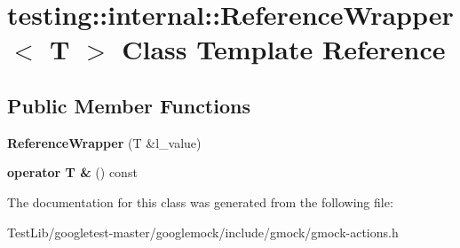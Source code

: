 \hypertarget{classtesting_1_1internal_1_1ReferenceWrapper}{}\section{testing\+:\+:internal\+:\+:Reference\+Wrapper$<$ T $>$ Class Template Reference}
\label{classtesting_1_1internal_1_1ReferenceWrapper}
\subsection*{Public Member Functions}
\begin{DoxyCompactItemize}
\item 
\mbox{\label{classtesting_1_1internal_1_1ReferenceWrapper_ad33597ffc478c3af9190d1a288a76d39}} 
{\bfseries Reference\+Wrapper} (T \&l\+\_\+value)
\item 
\mbox{\label{classtesting_1_1internal_1_1ReferenceWrapper_a187d6e6ffb4031444fff10dee7dc7de8}} 
{\bfseries operator T \&} () const
\end{DoxyCompactItemize}


The documentation for this class was generated from the following file\+:\begin{DoxyCompactItemize}
\item 
Test\+Lib/googletest-\/master/googlemock/include/gmock/gmock-\/actions.\+h\end{DoxyCompactItemize}
